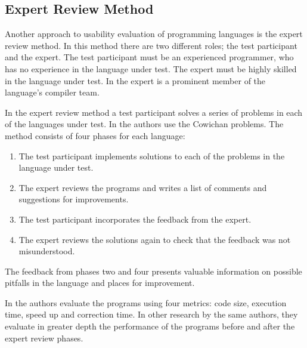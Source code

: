 \subsection{Expert Review Method} \label{sec:expert-review}
Another approach to usability evaluation of programming languages is the expert review method\cite{nanz2013examining}. In this method there are two different roles; the test participant and the expert. The test participant must be an experienced programmer, who has no experience in the language under test. The expert must be highly skilled in the language under test. In \cite{nanz2013examining} the expert is a prominent member of the language's compiler team.

In the expert review method a test participant solves a series of problems in each of the languages under test. In \cite{nanz2013examining} the authors use the Cowichan problems\cite{wilson1995assessing}. The method consists of four phases for each language:
\begin{enumerate}
    \item The test participant implements solutions to each of the problems in the language under test.
    \item The expert reviews the programs and writes a list of comments and suggestions for improvements.
    \item The test participant incorporates the feedback from the expert.
    \item The expert reviews the solutions again to check that the feedback was not misunderstood.
\end{enumerate}
The feedback from phases two and four presents valuable information on possible pitfalls in the language and places for improvement.

In \cite{nanz2013examining} the authors evaluate the programs using four metrics: code size, execution time, speed up and correction time. In other research by the same authors, they evaluate in greater depth the performance of the programs before and after the expert review phases\cite{nanz2013benchmarking}.
